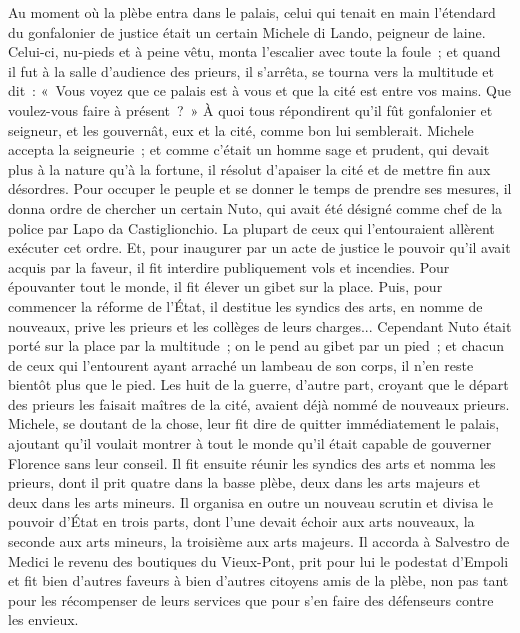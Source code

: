 \documentclass[french,twoside]{book} %
\newenvironment{quoteblock}%
  {\begin{quoting}}
  {\end{quoting}}
\newenvironment{quotebar}{%
    \def\FrameCommand{{\color{rubric!10!}\vrule width 0.5em} \hspace{0.9em}}%
    \def\OuterFrameSep{\itemsep} %
    \MakeFramed {\advance\hsize-\width \FrameRestore}
  }%
  {%
    \endMakeFramed
  }
\renewenvironment{quoteblock}%
  {%
    \savenotes
    \setstretch{0.9}
    \normalfont
    \begin{quotebar}
  }
  {%
    \end{quotebar}
    \spewnotes
  }
\begin{document}
\begin{quoteblock}
 Au moment où la plèbe entra dans le palais, celui qui tenait en main l'éten­dard du gonfalonier de justice était un certain Michele di Lando, peigneur de laine. Celui-ci, nu-pieds et à peine vêtu, monta l'escalier avec toute la foule ; et quand il fut à la salle d'audience des prieurs, il s'arrêta, se tourna vers la multitude et dit : « Vous voyez que ce palais est à vous et que la cité est entre vos mains. Que voulez-vous faire à présent ? » À quoi tous répondirent qu'il fût gonfalonier et seigneur, et les gouvernât, eux et la cité, comme bon lui semblerait. Michele accepta la seigneurie ; et comme c'était un homme sage et prudent, qui devait plus à la nature qu'à la fortune, il résolut d'apaiser la cité et de mettre fin aux désordres. Pour occuper le peuple et se donner le temps de prendre ses mesures, il donna ordre de chercher un certain Nuto, qui avait été désigné comme chef de la police par Lapo da Castiglionchio. La plupart de ceux qui l'entouraient allèrent exécuter cet ordre. Et, pour inaugurer par un acte de justice le pouvoir qu'il avait acquis par la faveur, il fit interdire publiquement vols et incendies. Pour épouvanter tout le monde, il fit élever un gibet sur la place. Puis, pour commencer la réforme de l'État, il destitue les syndics des arts, en nomme de nouveaux, prive les prieurs et les collèges de leurs charges... Cependant Nuto était porté sur la place par la multitude ; on le pend au gibet par un pied ; et chacun de ceux qui l'entourent ayant arraché un lambeau de son corps, il n'en reste bientôt plus que le pied. Les huit de la guerre, d'autre part, croyant que le départ des prieurs les faisait maîtres de la cité, avaient déjà nommé de nouveaux prieurs. Michele, se doutant de la chose, leur fit dire de quitter immédiatement le palais, ajoutant qu'il voulait montrer à tout le monde qu'il était capable de gouverner Florence sans leur conseil. Il fit ensuite réunir les syndics des arts et nomma les prieurs, dont il prit quatre dans la basse plèbe, deux dans les arts majeurs et deux dans les arts mineurs. Il organisa en outre un nouveau scrutin et divisa le pouvoir d'État en trois parts, dont l'une devait échoir aux arts nouveaux, la seconde aux arts mineurs, la troisième aux arts majeurs. Il accorda à Salvestro de Medici le revenu des boutiques du Vieux-Pont, prit pour lui le podestat d'Empoli et fit bien d'autres faveurs à bien d'autres citoyens amis de la plèbe, non pas tant pour les récompenser de leurs services que pour s'en faire des défenseurs contre les envieux.\par

\end{quoteblock}
\end{document}
